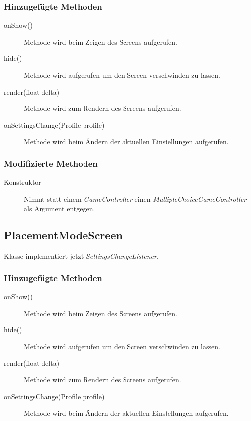 \subsubsection{Hinzugefügte Methoden}
\begin{description}

\item[onShow()]
Methode wird beim Zeigen des Screens aufgerufen.

\item[hide()]
Methode wird aufgerufen um den Screen verschwinden zu lassen.

\item[render(float delta)]
Methode wird zum Rendern des Screens aufgerufen.

\item[onSettingsChange(Profile profile)]
Methode wird beim Ändern der aktuellen Einstellungen aufgerufen.
\end{description}

\subsubsection{Modifizierte Methoden}
\begin{description}
\item[Konstruktor]
Nimmt statt einem \emph{GameController} einen \emph{MultipleChoiceGameController} als Argument entgegen.

\end{description}

\subsection{PlacementModeScreen}
Klasse implementiert jetzt \emph{SettingsChangeListener}.

\subsubsection{Hinzugefügte Methoden}
\begin{description}

\item[onShow()]
Methode wird beim Zeigen des Screens aufgerufen.

\item[hide()]
Methode wird aufgerufen um den Screen verschwinden zu lassen.

\item[render(float delta)]
Methode wird zum Rendern des Screens aufgerufen.

\item[onSettingsChange(Profile profile)]
Methode wird beim Ändern der aktuellen Einstellungen aufgerufen.
\end{description}

